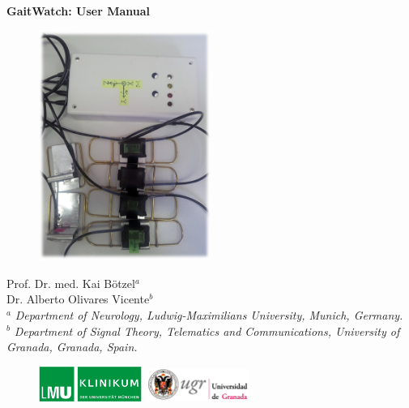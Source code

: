 \begin{titlepage}
\label{ch:cover}
\begin{center}


\vspace{2cm}



\vspace{1cm}
\textbf{\Huge{GaitWatch: User Manual}}
\vspace{1.2cm}
\begin{figure}[H]
\centering
\includegraphics[width=0.5\textwidth]{figures/GW_cover.jpg}
\end{figure}

\end{center}

\vspace{0.5cm}
 

\begin{center}Prof. Dr. med. Kai B\"otzel$^{a}$\\ 
Dr. Alberto Olivares Vicente$^{b}$\\\vspace{0.6cm}
$^{a}$ \textit{Department of Neurology, Ludwig-Maximilians University, Munich, Germany.}\\
$^{b}$ \textit{Department of Signal Theory, Telematics and Communications, University of Granada, Granada, Spain.}\\
\end{center}

\vspace{1cm}
\begin{figure}[H]
\raggedleft
\includegraphics[width=0.3\textwidth]{figures/lmu_logo.png}
\includegraphics[width=0.3\textwidth]{figures/ugr_logo.jpg}
\end{figure}

\end{titlepage}
